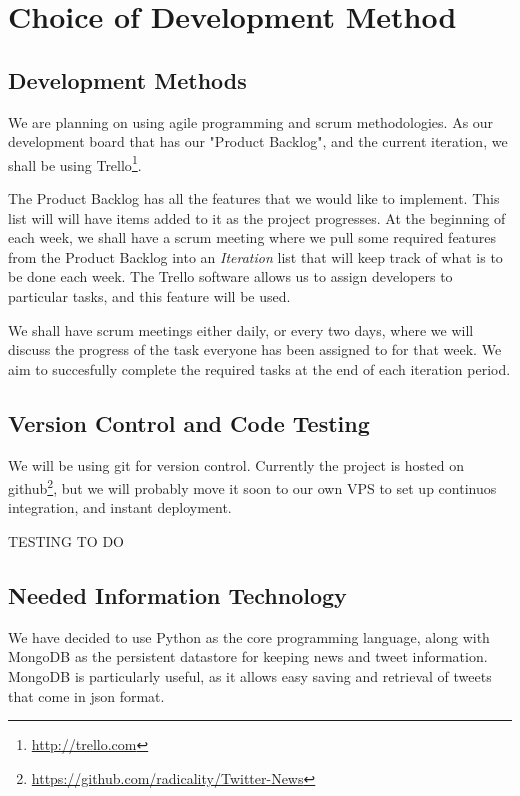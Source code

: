 \documentclass[a4paper,11pt]{article}
\begin{document}
	\section{Choice of Development Method}
		\subsection{Development Methods}
		
			We are planning on using agile programming and scrum methodologies. As our development board that has our "Product Backlog", and the current iteration, we shall be using Trello\footnote{\url{http://trello.com}}.
			
			The Product Backlog has all the features that we would like to implement. This list will will have items added to it as the project progresses. At the beginning of each week, we shall have a scrum meeting where we pull some required features from the Product Backlog into an \emph{Iteration} list that will keep track of what is to be done each week. The Trello software allows us to assign developers to particular tasks, and this feature will be used.
			
			We shall have scrum meetings either daily, or every two days, where we will discuss the progress of the task everyone has been assigned to for that week. We aim to succesfully complete the required tasks at the end of each iteration period.
	
	
		\subsection{Version Control and Code Testing}
		
			We will be using git for version control. Currently the project is hosted on github\footnote{\url{https://github.com/radicality/Twitter-News}}, but we will probably move it soon to our own VPS to set up continuos integration, and instant deployment.
			
			TESTING TO DO
			
			
		\subsection{Needed Information Technology}
			We have decided to use Python as the core programming language, along with MongoDB as the persistent datastore for keeping news and tweet information. MongoDB is particularly useful, as it allows easy saving and retrieval of tweets that come in json format.
			
\end{document}
